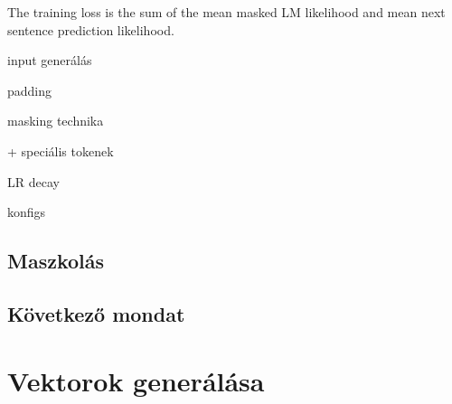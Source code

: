 \pagebreak




The training loss is the sum of the mean masked LM likelihood and mean next sentence prediction likelihood.

input generálás

padding

masking technika

+ speciális tokenek

LR decay

konfigs



\subsection{Maszkolás}

\subsection{Következő mondat}


\section{Vektorok generálása}